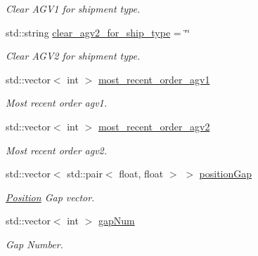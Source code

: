 \begin{DoxyCompactItemize}
\begin{DoxyCompactList}\small\item\em Clear A\+G\+V1 for shipment type. \end{DoxyCompactList}\item 
\mbox{\label{classBuildClass_a4f1d9c135fd347f4e88722a389017c25}} 
std\+::string \hyperlink{classBuildClass_a4f1d9c135fd347f4e88722a389017c25}{clear\+\_\+agv2\+\_\+for\+\_\+ship\+\_\+type} = \char`\"{}\char`\"{}
\begin{DoxyCompactList}\small\item\em Clear A\+G\+V2 for shipment type. \end{DoxyCompactList}\item 
\mbox{\label{classBuildClass_ad9f54938ad08ac1e9b1902d8acde2448}} 
std\+::vector$<$ int $>$ \hyperlink{classBuildClass_ad9f54938ad08ac1e9b1902d8acde2448}{most\+\_\+recent\+\_\+order\+\_\+agv1}
\begin{DoxyCompactList}\small\item\em Most recent order agv1. \end{DoxyCompactList}\item 
\mbox{\label{classBuildClass_a23919ef11440ca0d514f5b677b729cb7}} 
std\+::vector$<$ int $>$ \hyperlink{classBuildClass_a23919ef11440ca0d514f5b677b729cb7}{most\+\_\+recent\+\_\+order\+\_\+agv2}
\begin{DoxyCompactList}\small\item\em Most recent order agv2. \end{DoxyCompactList}\item 
\mbox{\label{classBuildClass_ad2928c00304dde02561cdfd214f5ada2}} 
std\+::vector$<$ std\+::pair$<$ float, float $>$ $>$ \hyperlink{classBuildClass_ad2928c00304dde02561cdfd214f5ada2}{position\+Gap}
\begin{DoxyCompactList}\small\item\em \hyperlink{structPosition}{Position} Gap vector. \end{DoxyCompactList}\item 
\mbox{\label{classBuildClass_a85c6af17d47644b2353b81dfc3399200}} 
std\+::vector$<$ int $>$ \hyperlink{classBuildClass_a85c6af17d47644b2353b81dfc3399200}{gap\+Num}
\begin{DoxyCompactList}\small\item\em Gap Number. \end{DoxyCompactList}\end{DoxyCompactItemize}


